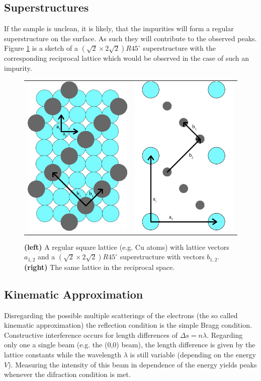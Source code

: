 \documentclass[a4paper]{scrartcl}
\numberwithin{equation}{section}
\numberwithin{figure}{section}
\numberwithin{table}{section}
\begin{document}
\subsection{Superstructures}
\label{sec:super}
If the sample is unclean, it is likely, that the impurities will form a regular superstructure on the surface. As such they will contribute to the observed peaks. Figure \ref{fig:superstructure} is a sketch of a $(\sqrt{2} \times 2\sqrt{2})R45^\circ$ superstructure with the corresponding reciprocal lattice which would be observed in the case of such an impurity.
\begin{figure}[!bthp]
        \begin{center}
        \begin{tabular}{l r}
        		\includegraphics[width=0.2\linewidth]{pic/superstructure.pdf}
       	&
       		\includegraphics[width=0.2\linewidth]{pic/superstructure2.pdf}
		  \end{tabular}
        \end{center}
        \caption{
			\small \textbf{(left)} A regular square lattice (e.g. Cu atoms) with lattice vectors $a_{1,2}$ and a  $(\sqrt{2} \times 2\sqrt{2})R45^\circ$ superstructure with vectors $b_{1,2}$.
			\textbf{(right)} The same lattice in the reciprocal space.
        }
        \label{fig:superstructure}
\end{figure}


\subsection{Kinematic Approximation}
Disregarding the possible multiple scatterings of the electrons (the so called kinematic approximation) the reflection condition is the simple Bragg condition. Constructive interference occurs for length differences of $\Delta s = n\lambda$. Regarding only one a single beam (e.g. the (0,0) beam), the length difference is given by the lattice constants while the wavelength $\lambda$ is still variable (depending on the energy $V$). Measuring the intensity of this beam in dependence of the energy yields peaks whenever the difraction condition is met.
\end{document}
